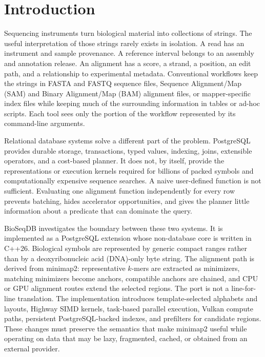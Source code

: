 \chapter*{Introduction}
    Sequencing instruments turn biological material into collections of
    strings.  The useful interpretation of those strings rarely exists
    in isolation.  A read has an instrument and sample provenance.  A
    reference interval belongs to an assembly and annotation release.
    An alignment has a score, a strand, a position, an edit path, and a
    relationship to experimental metadata.  Conventional workflows keep
    the strings in FASTA and FASTQ sequence files, Sequence Alignment/Map
    (SAM) and Binary Alignment/Map (BAM) alignment files, or mapper-specific
    index files
    while keeping much of the surrounding information in tables or
    ad-hoc scripts.  Each tool sees only the portion of the workflow
    represented by its command-line arguments.

    Relational database systems solve a different part of the problem.
    PostgreSQL provides durable storage, transactions, typed values,
    indexing, joins, extensible operators, and a cost-based planner.  It
    does not, by itself, provide the representations or execution kernels
    required for billions of packed symbols and computationally
    expensive sequence searches.  A naive user-defined function is not
    sufficient.  Evaluating one alignment function independently for
    every row prevents batching, hides accelerator opportunities, and
    gives the planner little information about a predicate that can
    dominate the query.

    BioSeqDB investigates the boundary between these two systems.  It is
    implemented as a PostgreSQL extension whose non-database core is
    written in C++26.  Biological symbols are represented by generic
    compact ranges rather than by a deoxyribonucleic acid (DNA)-only byte
    string.  The alignment
    path is derived from minimap2: representative $k$-mers are extracted
    as minimizers, matching minimizers become anchors, compatible anchors
    are chained, and CPU or GPU alignment routes extend the selected regions.
    The port is not a line-for-line translation.  The
    implementation introduces template-selected alphabets and layouts,
    Highway SIMD kernels, task-based parallel execution, Vulkan compute
    paths, persistent PostgreSQL-backed indexes, and prefilters for
    candidate regions.  These changes must preserve the semantics that
    make minimap2 useful while operating on data that may be lazy,
    fragmented, cached, or obtained from an external provider.

